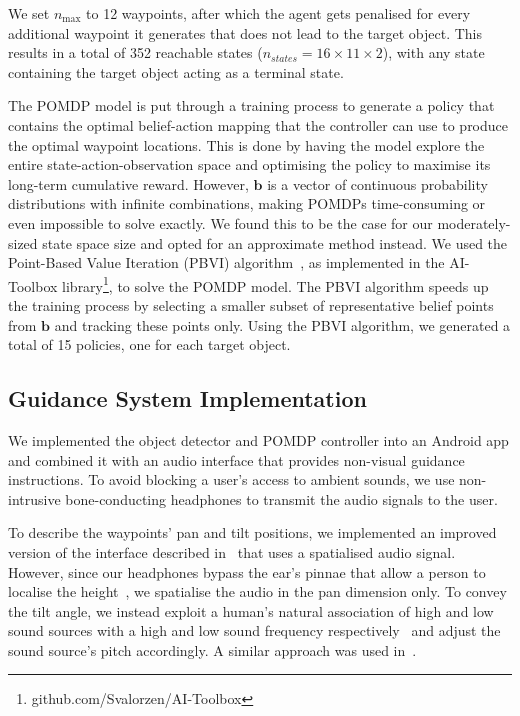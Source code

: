\documentclass[runningheads]{llncs}
\begin{document}
\noindent We set $n_{\max}$ to 12 waypoints, after which the agent gets penalised for every additional waypoint it generates that does not lead to the target object. 
This results in a total of 352 reachable states ($n_{states} = 16\times11\times2$), with any state containing the target object acting as a terminal state.

The POMDP model is put through a training process to generate a policy that contains the optimal belief-action mapping that the controller can use to produce the optimal waypoint locations.
This is done by having the model explore the entire state-action-observation space and optimising the policy to maximise its long-term cumulative reward.
However, $\mathbf{b}$ is a vector of continuous probability distributions with infinite combinations, making POMDPs time-consuming or even impossible to solve exactly.
We found this to be the case for our moderately-sized state space size and opted for an approximate method instead.
We used the Point-Based Value Iteration (PBVI) algorithm~\cite{pineau2003point}, as implemented in the AI-Toolbox library\footnote{github.com/Svalorzen/AI-Toolbox}, to solve the POMDP model.
The PBVI algorithm speeds up the training process by selecting a smaller subset of representative belief points from $\mathbf{b}$ and tracking these points only. 
Using the PBVI algorithm, we generated a total of 15 policies, one for each target object. 

\subsection{Guidance System Implementation}

We implemented the object detector and POMDP controller into an Android app and combined it with an audio interface that provides non-visual guidance instructions.
To avoid blocking a user's access to ambient sounds, we use non-intrusive bone-conducting headphones to transmit the audio signals to the user. 

To describe the waypoints' pan and tilt positions, we implemented an improved version of the interface described in~\cite{bellotto2013} that uses a spatialised audio signal.
However, since our headphones bypass the ear's pinnae that allow a person to localise the height~\cite{roffler1968factors}, we spatialise the audio in the pan dimension only.
To convey the tilt angle, we instead exploit a human's natural association of high and low sound sources with a high and low sound frequency respectively~\cite{blauert1997spatial} and adjust the sound source's pitch accordingly. 
A similar approach was used in~\cite{schauerte2012assistive}.
\end{document}
